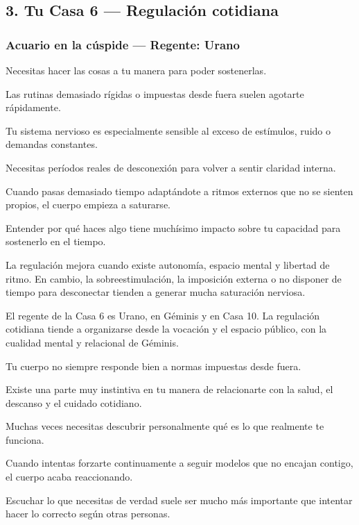 \documentclass[11pt,a4paper]{article}
\begin{document}
\subsection{3. Tu Casa 6 — Regulación cotidiana}

\subsubsection*{Acuario en la cúspide — Regente: Urano}

Necesitas hacer las cosas a tu manera para poder sostenerlas.

Las rutinas demasiado rígidas o impuestas desde fuera suelen agotarte rápidamente.

Tu sistema nervioso es especialmente sensible al exceso de estímulos, ruido o demandas constantes.

Necesitas períodos reales de desconexión para volver a sentir claridad interna.

Cuando pasas demasiado tiempo adaptándote a ritmos externos que no se sienten propios, el cuerpo empieza a saturarse.

Entender por qué haces algo tiene muchísimo impacto sobre tu capacidad para sostenerlo en el tiempo.

La regulación mejora cuando existe autonomía, espacio mental y libertad de ritmo. En cambio, la sobreestimulación, la imposición externa o no disponer de tiempo para desconectar tienden a generar mucha saturación nerviosa.

El regente de la Casa 6 es Urano, en Géminis y en Casa 10. La regulación cotidiana tiende a organizarse desde la vocación y el espacio público, con la cualidad mental y relacional de Géminis.

Tu cuerpo no siempre responde bien a normas impuestas desde fuera.

Existe una parte muy instintiva en tu manera de relacionarte con la salud, el descanso y el cuidado cotidiano.

Muchas veces necesitas descubrir personalmente qué es lo que realmente te funciona.

Cuando intentas forzarte continuamente a seguir modelos que no encajan contigo, el cuerpo acaba reaccionando.

Escuchar lo que necesitas de verdad suele ser mucho más importante que intentar hacer lo correcto según otras personas.

\end{document}
